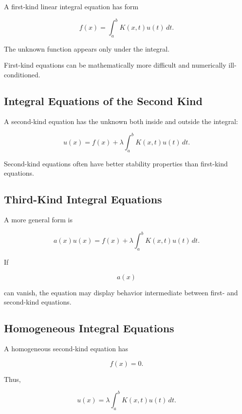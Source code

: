 A first-kind linear integral equation has form

\[
\boxed{
f(x)
=
\int_a^b
K(x,t)u(t)\,dt.
}
\]

The unknown function appears only under the integral.

First-kind equations can be mathematically more difficult and numerically
ill-conditioned.

\subsection{Integral Equations of the Second Kind}
\label{subsec:second-kind-integral-equations}

A second-kind equation has the unknown both inside and outside the
integral:

\[
\boxed{
u(x)
=
f(x)
+
\lambda
\int_a^b
K(x,t)u(t)\,dt.
}
\]

Second-kind equations often have better stability properties than
first-kind equations.

\subsection{Third-Kind Integral Equations}
\label{subsec:third-kind-integral-equations}

A more general form is

\[
\boxed{
a(x)u(x)
=
f(x)
+
\lambda
\int_a^b
K(x,t)u(t)\,dt.
}
\]

If

\[
a(x)
\]

can vanish, the equation may display behavior intermediate between first-
and second-kind equations.

\subsection{Homogeneous Integral Equations}
\label{subsec:homogeneous-integral-equations}

A homogeneous second-kind equation has

\[
f(x)=0.
\]

Thus,

\[
\boxed{
u(x)
=
\lambda
\int_a^b
K(x,t)u(t)\,dt.
}
\]

